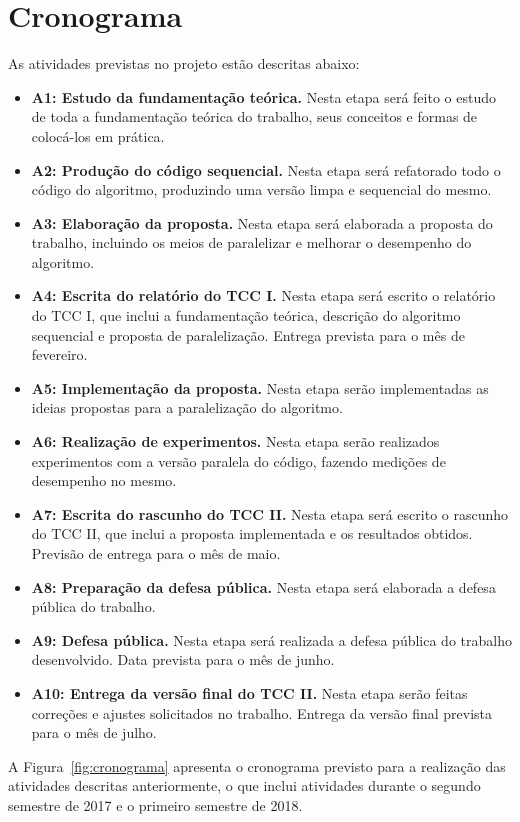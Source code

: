\chapter{Cronograma}
\label{cap5}

As atividades previstas no projeto estão descritas abaixo:

\begin{itemize}
    \item \textbf{A1: Estudo da fundamentação teórica.} Nesta etapa será feito o estudo de toda a fundamentação teórica do trabalho, seus conceitos e formas de colocá-los em prática.
    \item \textbf{A2: Produção do código sequencial.} Nesta etapa será refatorado todo o código do algoritmo, produzindo uma versão limpa e sequencial do mesmo.
    \item \textbf{A3: Elaboração da proposta.} Nesta etapa será elaborada a proposta do trabalho, incluindo os meios de paralelizar e melhorar o desempenho do algoritmo.
    \item \textbf{A4: Escrita do relatório do TCC I.} Nesta etapa será escrito o relatório do TCC I, que inclui a fundamentação teórica, descrição do algoritmo sequencial e proposta de paralelização. Entrega prevista para o mês de fevereiro.
    \item \textbf{A5: Implementação da proposta.} Nesta etapa serão implementadas as ideias propostas para a paralelização do algoritmo.
    \item \textbf{A6: Realização de experimentos.} Nesta etapa serão realizados experimentos com a versão paralela do código, fazendo medições de desempenho no mesmo.
    \item \textbf{A7: Escrita do rascunho do TCC II.} Nesta etapa será escrito o rascunho do TCC II, que inclui a proposta implementada e os resultados obtidos. Previsão de entrega para o mês de maio.
    \item \textbf{A8: Preparação da defesa pública.} Nesta etapa será elaborada a defesa pública do trabalho.
    \item \textbf{A9: Defesa pública.} Nesta etapa será realizada a defesa pública do trabalho desenvolvido. Data prevista para o mês de junho.
    \item \textbf{A10: Entrega da versão final do TCC II.} Nesta etapa serão feitas correções e ajustes solicitados no trabalho. Entrega da versão final prevista para o mês de julho.
\end{itemize}

A Figura~\ref{fig:cronograma} apresenta o cronograma previsto para a realização das atividades descritas anteriormente, o que inclui atividades durante o segundo semestre de 2017 e o primeiro semestre de 2018.

